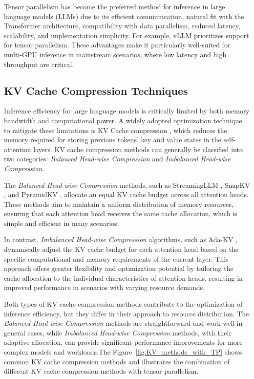 Tensor parallelism has become the preferred method for inference in large language models (LLMs) due to its efficient communication, natural fit with the Transformer architecture, compatibility with data parallelism, reduced latency, scalability, and implementation simplicity. For example, vLLM \cite{kwon2023efficient} prioritizes support for tensor parallelism. These advantages make it particularly well-suited for multi-GPU inference in mainstream scenarios, where low latency and high throughput are critical.

\subsection{KV Cache Compression Techniques}
Inference efficiency for large language models is critically limited by both memory bandwidth and computational power. A widely adopted optimization technique to mitigate these limitations is KV Cache compression \cite{ge2024modeltellsdiscardadaptive, zhang2023h2o, yang2024pyramidinfer}, which reduces the memory required for storing previous tokens’ key and value states in the self-attention layers. KV cache compression methods can generally be classified into two categories: \textit{Balanced Head-wise Compression} and \textit{Imbalanced Head-wise Compression}.

The \textit{Balanced Head-wise Compression} methods, such as StreamingLLM \cite{xiao2024efficientstreaminglanguagemodels}, SnapKV \cite{li2024snapkvllmknowslooking}, and PyramidKV \cite{cai2024pyramidkvdynamickvcache}, allocate an equal KV cache budget across all attention heads. These methods aim to maintain a uniform distribution of memory resources, ensuring that each attention head receives the same cache allocation, which is simple and efficient in many scenarios.

In contrast, \textit{Imbalanced Head-wise Compression} algorithms, such as Ada-KV \cite{feng2024adakv}, dynamically adjust the KV cache budget for each attention head based on the specific computational and memory requirements of the current layer. This approach offers greater flexibility and optimization potential by tailoring the cache allocation to the individual characteristics of attention heads, resulting in improved performance in scenarios with varying resource demands.

Both types of KV cache compression methods contribute to the optimization of inference efficiency, but they differ in their approach to resource distribution. The \textit{Balanced Head-wise Compression} methods are straightforward and work well in general cases, while \textit{Imbalanced Head-wise Compression} methods, with their adaptive allocation, can provide significant performance improvements for more complex models and workloads.The Figure~\ref{fig:KV_methods_with_TP} shows common KV cache compression methods and illustrates the combination of different KV cache compression methods with tensor parallelism.

